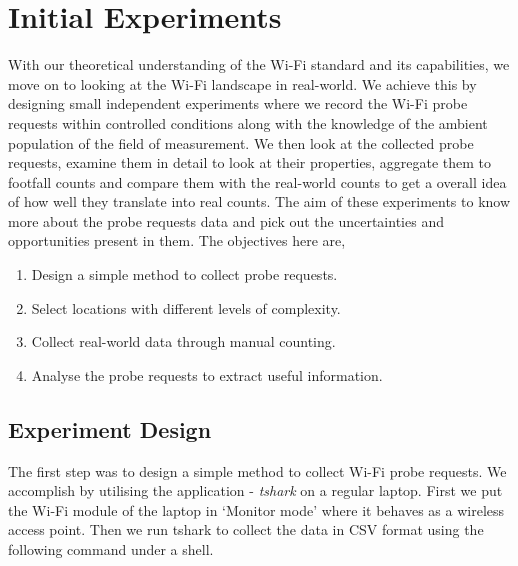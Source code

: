 \section{Initial Experiments}

With our theoretical understanding of the Wi-Fi standard and its capabilities, we move on to looking at the Wi-Fi landscape in real-world.
We achieve this by designing small independent experiments where we record the Wi-Fi probe requests within controlled conditions along with the knowledge of the ambient population of the field of measurement. 
We then look at the collected probe requests, examine them in detail to look at their properties, aggregate them to footfall counts and compare them with the real-world counts to get a overall idea of how well they translate into real counts.
The aim of these experiments to know more about the probe requests data and pick out the uncertainties and opportunities present in them.
The objectives here are,

\begin{enumerate}
  \setlength{\itemindent}{2em}
  \itemsep-0.25em
   \item Design a simple method to collect probe requests.
  \item Select locations with different levels of complexity.
  \item Collect real-world data through manual counting.
  \item Analyse the probe requests to extract useful information.
\end{enumerate}

\subsection{Experiment Design}

The first step was to design a simple method to collect Wi-Fi probe requests.
We accomplish by utilising the application - \textit{tshark} \cite{wireshark2} on a regular laptop.
First we put the Wi-Fi module of the laptop in `Monitor mode' where it behaves as a wireless access point.
Then we run tshark to collect the data in CSV format using the following command under a shell.

